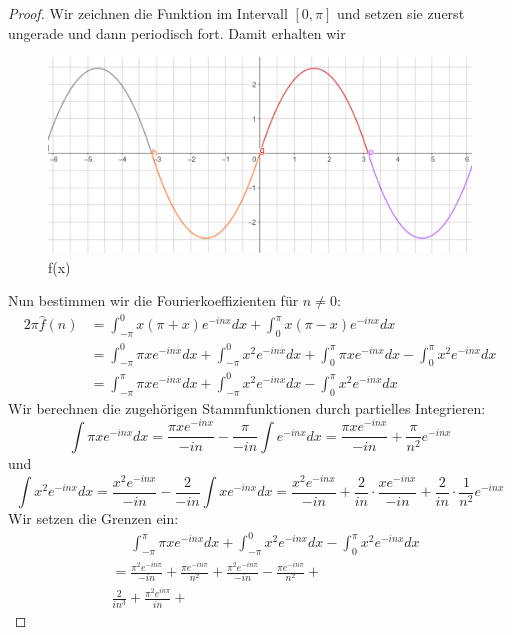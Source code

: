 \documentclass[11pt]{article}
\begin{document}
    \begin{proof}
        Wir zeichnen die Funktion im Intervall $[0,\pi]$ und setzen sie zuerst ungerade und dann
        periodisch fort. Damit erhalten wir
        \begin{figure}
            \includegraphics[width=\linewidth]{Unbenannt.PNG}
            \caption{f(x)}
        \end{figure}
        Nun bestimmen wir die Fourierkoeffizienten für $n\neq 0$:
        $$\begin{aligned}
              2\pi\hat{f}(n) &= \int_{-\pi}^0 x(\pi+x)e^{-inx}dx + \int^{\pi}_0 x(\pi-x)e^{-inx}dx\\
              &= \int_{-\pi}^0 \pi xe^{-inx}dx +\int_{-\pi}^0 x^2e^{-inx}dx +
              \int^{\pi}_0 \pi x e^{-inx}dx-\int^{\pi}_0 x^2e^{-inx}dx\\
              &= \int^{\pi}_{-\pi} \pi x e^{-inx}dx+\int_{-\pi}^0 x^2e^{-inx}dx-\int^{\pi}_0 x^2e^{-inx}dx
        \end{aligned}$$
        Wir berechnen die zugehörigen Stammfunktionen durch partielles Integrieren:
        $$\int\pi xe^{-inx}dx = \frac{\pi xe^{-inx}}{-in}-\frac{\pi}{-in}\int e^{-inx}dx =
        \frac{\pi xe^{-inx}}{-in}+\frac{\pi}{n^2}e^{-inx}$$
        und
        $$\int x^2e^{-inx}dx=\frac{x^2 e^{-inx}}{-in}-\frac{2}{-in}\int xe^{-inx}dx =
        \frac{x^2 e^{-inx}}{-in}+\frac{2}{in}\cdot\frac{ xe^{-inx}}{-in}+\frac{2}{in}\cdot
        \frac{1}{n^2}e^{-inx}$$
        Wir setzen die Grenzen ein:
        $$\begin{aligned}
              &\phantom{=}\int^{\pi}_{-\pi} \pi x e^{-inx}dx+\int_{-\pi}^0 x^2e^{-inx}dx-
              \int^{\pi}_0 x^2e^{-inx}dx\\
              &= \frac{\pi^2 e^{-in\pi}}{-in}+\frac{\pi e^{-in\pi}}{n^2}+\frac{\pi^2 e^{-in\pi}}{-in}-
              \frac{\pi e^{-in\pi}}{n^2}+\\&\frac{2}{in^3}+\frac{\pi^2 e^{in\pi}}{in}+

\end{aligned}$$
\end{proof}
\end{document}
